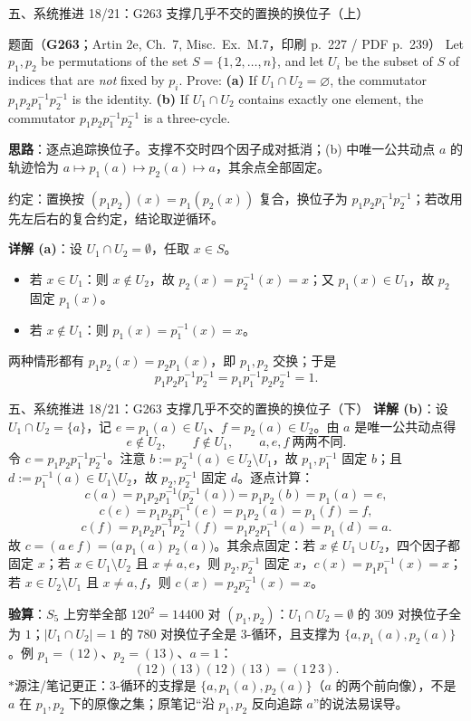\documentclass[aspectratio=169,10pt,fontset=none]{ctexbeamer}
\newcommand{\ex}[1]{\textcolor{accent}{\footnotesize\bfseries #1}}
\newcommand{\key}[1]{\textcolor{ink}{\bfseries #1}}
\newcommand{\starpt}{\textcolor{accent}{\bfseries$\ast$}}
\begin{document}
\begin{frame}[t]{五、系统推进 18/21：G263 支撑几乎不交的置换的换位子（上）}
\label{ex:G263}
\scriptsize
\begin{block}{\footnotesize 题面（\ex{G263}；Artin 2e, Ch.~7, Misc.\ Ex.~M.7，印刷 p.~227 / PDF p.~239）}
Let $p_1,p_2$ be permutations of the set $S=\{1,2,\dots,n\}$, and let $U_i$ be the subset of $S$ of indices that are \emph{not} fixed by $p_i$. Prove: \textbf{(a)} If $U_1\cap U_2=\varnothing$, the commutator $p_1p_2p_1^{-1}p_2^{-1}$ is the identity. \textbf{(b)} If $U_1\cap U_2$ contains exactly one element, the commutator $p_1p_2p_1^{-1}p_2^{-1}$ is a three-cycle.
\end{block}
\key{思路}：逐点追踪换位子。支撑不交时四个因子成对抵消；(b) 中唯一公共动点 $a$ 的轨迹恰为 $a\mapsto p_1(a)\mapsto p_2(a)\mapsto a$，其余点全部固定。

约定：置换按 $(p_1p_2)(x)=p_1(p_2(x))$ 复合，换位子为 $p_1p_2p_1^{-1}p_2^{-1}$；若改用先左后右的复合约定，结论取逆循环。

\key{详解 (a)}：设 $U_1\cap U_2=\emptyset$，任取 $x\in S$。
\begin{itemize}
\item 若 $x\in U_1$：则 $x\notin U_2$，故 $p_2(x)=p_2^{-1}(x)=x$；又 $p_1(x)\in U_1$，故 $p_2$ 固定 $p_1(x)$。
\item 若 $x\notin U_1$：则 $p_1(x)=p_1^{-1}(x)=x$。
\end{itemize}
两种情形都有 $p_1p_2(x)=p_2p_1(x)$，即 $p_1,p_2$ 交换；于是
\[ p_1p_2p_1^{-1}p_2^{-1}=p_1p_1^{-1}p_2p_2^{-1}=1. \]
\end{frame}

\begin{frame}[t]{五、系统推进 18/21：G263 支撑几乎不交的置换的换位子（下）}
\scriptsize
\key{详解 (b)}：设 $U_1\cap U_2=\{a\}$，记 $e=p_1(a)\in U_1$、$f=p_2(a)\in U_2$。由 $a$ 是唯一公共动点得
\[ e\notin U_2,\qquad f\notin U_1,\qquad a,e,f\ \text{两两不同}. \]
令 $c=p_1p_2p_1^{-1}p_2^{-1}$。注意 $b:=p_2^{-1}(a)\in U_2\setminus U_1$，故 $p_1,p_1^{-1}$ 固定 $b$；且 $d:=p_1^{-1}(a)\in U_1\setminus U_2$，故 $p_2,p_2^{-1}$ 固定 $d$。逐点计算：
\[ c(a)=p_1p_2p_1^{-1}\bigl(p_2^{-1}(a)\bigr)=p_1p_2(b)=p_1(a)=e, \]
\[ c(e)=p_1p_2p_1^{-1}(e)=p_1p_2(a)=p_1(f)=f, \]
\[ c(f)=p_1p_2p_1^{-1}p_2^{-1}(f)=p_1p_2p_1^{-1}(a)=p_1(d)=a. \]
故 $c=(a\ e\ f)=\bigl(a\ p_1(a)\ p_2(a)\bigr)$。其余点固定：若 $x\notin U_1\cup U_2$，四个因子都固定 $x$；若 $x\in U_1\setminus U_2$ 且 $x\ne a,e$，则 $p_2,p_2^{-1}$ 固定 $x$，$c(x)=p_1p_1^{-1}(x)=x$；若 $x\in U_2\setminus U_1$ 且 $x\ne a,f$，则 $c(x)=p_2p_2^{-1}(x)=x$。

\key{验算}：$S_5$ 上穷举全部 $120^2=14400$ 对 $(p_1,p_2)$：$U_1\cap U_2=\emptyset$ 的 $309$ 对换位子全为 $1$；$|U_1\cap U_2|=1$ 的 $780$ 对换位子全是 $3$-循环，且支撑为 $\{a,p_1(a),p_2(a)\}$。例 $p_1=(12)$、$p_2=(13)$、$a=1$：
\[ (12)(13)(12)(13)=(1\,2\,3). \]
\starpt 源注/笔记更正：$3$-循环的支撑是 $\{a,p_1(a),p_2(a)\}$（$a$ 的两个前向像），不是 $a$ 在 $p_1,p_2$ 下的原像之集；原笔记“沿 $p_1,p_2$ 反向追踪 $a$”的说法易误导。
\end{frame}
\end{document}
